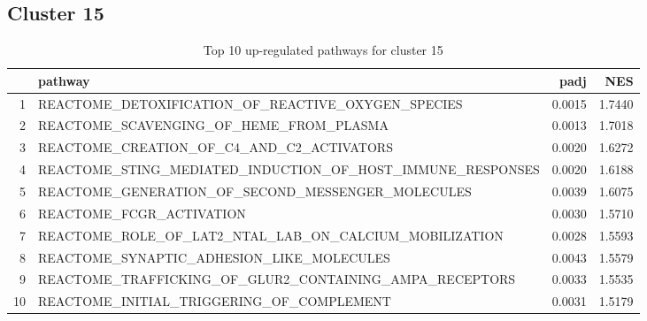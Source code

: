 \documentclass{article}
\begin{document}
\subsection{Cluster 15 }
\begin{table}[H]
\centering
\begin{tabularx}{\textwidth}{rlrr}
  \hline
 & pathway & padj & NES \\ 
  \hline
1 & REACTOME\_DETOXIFICATION\_OF\_REACTIVE\_OXYGEN\_SPECIES & 0.0015 & 1.7440 \\ 
  2 & REACTOME\_SCAVENGING\_OF\_HEME\_FROM\_PLASMA & 0.0013 & 1.7018 \\ 
  3 & REACTOME\_CREATION\_OF\_C4\_AND\_C2\_ACTIVATORS & 0.0020 & 1.6272 \\ 
  4 & REACTOME\_STING\_MEDIATED\_INDUCTION\_OF\_HOST\_IMMUNE\_RESPONSES & 0.0020 & 1.6188 \\ 
  5 & REACTOME\_GENERATION\_OF\_SECOND\_MESSENGER\_MOLECULES & 0.0039 & 1.6075 \\ 
  6 & REACTOME\_FCGR\_ACTIVATION & 0.0030 & 1.5710 \\ 
  7 & REACTOME\_ROLE\_OF\_LAT2\_NTAL\_LAB\_ON\_CALCIUM\_MOBILIZATION & 0.0028 & 1.5593 \\ 
  8 & REACTOME\_SYNAPTIC\_ADHESION\_LIKE\_MOLECULES & 0.0043 & 1.5579 \\ 
  9 & REACTOME\_TRAFFICKING\_OF\_GLUR2\_CONTAINING\_AMPA\_RECEPTORS & 0.0033 & 1.5535 \\ 
  10 & REACTOME\_INITIAL\_TRIGGERING\_OF\_COMPLEMENT & 0.0031 & 1.5179 \\ 
   \hline
\end{tabularx}
\caption{Top 10 up-regulated pathways for cluster 15} 
\label{tab:q3_2_15}
\end{table}
\end{document}
